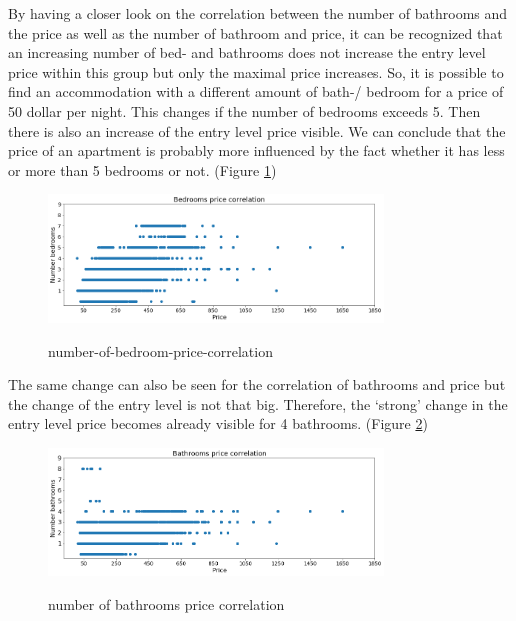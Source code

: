 \documentclass[journal]{IEEEtran}
\begin{document}
By having a closer look on the correlation between the number of bathrooms and the price as well as the number of bathroom and price, it can be recognized that an increasing number of bed- and bathrooms does not increase the entry level price within this group but only the maximal price increases. So, it is possible to find an accommodation with a different amount of bath-/ bedroom for a price of 50 dollar per night. This changes if the number of bedrooms exceeds 5. Then there is also an increase of the entry level price visible. We can conclude that the price of an apartment is probably more influenced by the fact whether it has less or more than 5 bedrooms or not. (Figure \ref{bedroom-price-correlation})
\begin{figure}
  \begin{center}
  \includegraphics[width=3.5in]{photo/10_bedrooms_price_correlation.png}\\
  \caption{number-of-bedroom-price-correlation}\label{bedroom-price-correlation}
  \end{center}
\end{figure}
The same change can also be seen for the correlation of bathrooms and price but the change of the entry level is not that big. Therefore, the ‘strong’ change in the entry level price becomes already visible for 4 bathrooms. (Figure \ref{bathrooms-price-correlation})
\begin{figure}
  \begin{center}
  \includegraphics[width=3.5in]{photo/9_bathroom_price_correlation.png}\\
  \caption{number of bathrooms price correlation}\label{bathrooms-price-correlation}
  \end{center}
\end{figure}
\end{document}

